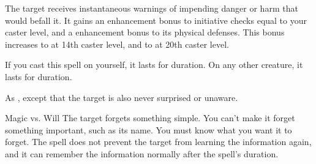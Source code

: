 \begin{spellheader}
\end{spellheader}
\begin{spelleffects}
    \spelleffect The target receives instantaneous warnings of impending danger or harm that would befall it. It gains an enhancement bonus to initiative checks equal to your caster level, and a  enhancement bonus to its physical defenses. This bonus increases to  at 14th caster level, and to  at 20th caster level.
    \par If you cast this spell on yourself, it lasts for \durlong duration. On any other creature, it lasts for \durshort duration.
\end{spelleffects}
\begin{spellfooter}

\end{spellfooter}

\begin{spellheader}
\end{spellheader}
\begin{spelleffects}
    \spelleffect As , except that the target is also never surprised or unaware.
\end{spelleffects}
\begin{spellfooter}

\end{spellfooter}

\begin{spellheader}
    \spellrng{\rngmed}
    \spelldur{\durlong}
\end{spellheader}
\begin{spelleffects}
    \begin{spellattack}{Magic vs. Will}
        \spelleffect The target forgets something simple. You can't make it forget something important, such as its name. You must know what you want it to forget. The spell does not prevent the target from learning the information again, and it can remember the information normally after the spell's duration.
    \end{spellattack}
\end{spelleffects}
\begin{spellfooter}

\end{spellfooter}

